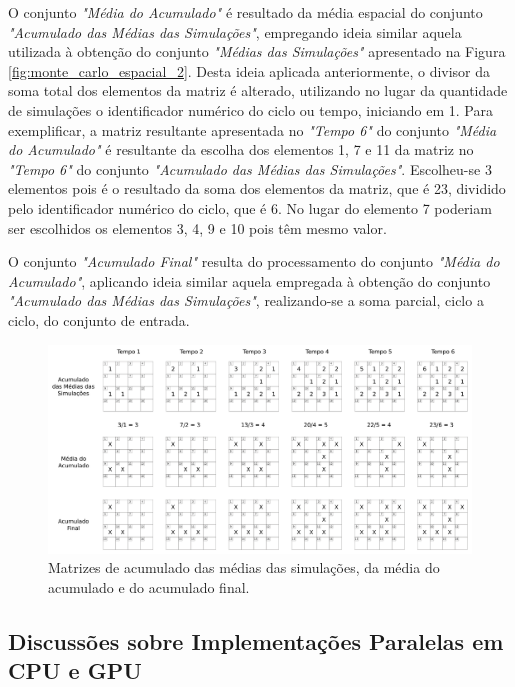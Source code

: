 O conjunto \textit{"Média do Acumulado"} é resultado da média espacial do conjunto \textit{"Acumulado das Médias das Simulações"}, empregando ideia similar aquela utilizada à obtenção do conjunto \textit{"Médias das Simulações"} apresentado na Figura \ref{fig:monte_carlo_espacial_2}. Desta ideia aplicada anteriormente, o divisor da soma total dos elementos da matriz é alterado, utilizando no lugar da quantidade de simulações o identificador numérico do ciclo ou tempo, iniciando em 1. Para exemplificar, a matriz resultante apresentada no \textit{"Tempo 6"} do conjunto \textit{"Média do Acumulado"} é resultante da escolha dos elementos 1, 7 e 11 da matriz no \textit{"Tempo 6"} do conjunto \textit{"Acumulado das Médias das Simulações"}. Escolheu-se 3 elementos pois é o resultado da soma dos elementos da matriz, que é 23, dividido pelo identificador numérico do ciclo, que é 6. No lugar do elemento 7 poderiam ser escolhidos os elementos 3, 4, 9 e 10 pois têm mesmo valor. 

O conjunto \textit{"Acumulado Final"} resulta do processamento do conjunto \textit{"Média do Acumulado"}, aplicando ideia similar aquela empregada à obtenção do conjunto \textit{"Acumulado das Médias das Simulações"}, realizando-se a soma parcial, ciclo a ciclo, do conjunto de entrada. 

\begin{figure}[H]
  \centering
  \includegraphics[width=1\textwidth]{Figuras/Observacoes/MonteCarloEspacial/folha3.png}
  \caption{Matrizes de acumulado das médias das simulações, da média do acumulado e do acumulado final. }
  \label{fig:monte_carlo_espacial_3}
\end{figure} 

\subsection{Discussões sobre Implementações Paralelas em CPU e GPU} 

